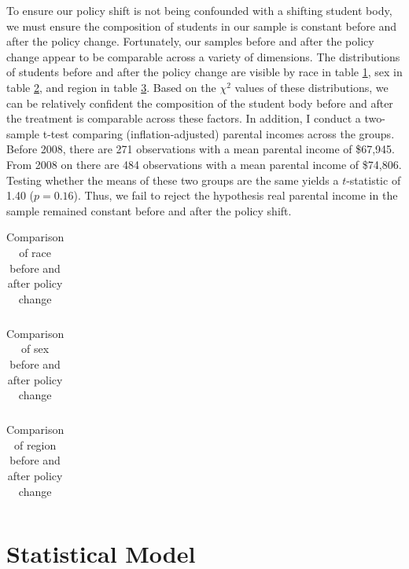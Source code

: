 \documentclass{article}
\begin{document}
	To ensure our policy shift is not being confounded with a shifting student body, we must ensure the composition of students in our sample is constant before and after the policy change. Fortunately, our samples before and after the policy change appear to be comparable across a variety of dimensions. The distributions of students before and after the policy change are visible by race in table \ref{racecomp}, sex in table \ref{sexcomp}, and region in table \ref{regioncomp}. Based on the $\chi^2$ values of these distributions, we can be relatively confident the composition of the student body before and after the treatment is comparable across these factors. In addition, I conduct a two-sample t-test comparing (inflation-adjusted) parental incomes across the groups. Before 2008, there are 271 observations with a mean parental income of \$67,945. From 2008 on there are 484 observations with a mean parental income of \$74,806. Testing whether the means of these two groups are the same yields a $t$-statistic of 1.40 ($p = 0.16$). Thus, we fail to reject the hypothesis real parental income in the sample remained constant before and after the policy shift. 
	
{
	\begin{table}
		\centering
		\caption{Comparison of race before and after policy change}
		\begin{tabular}{lrrrrrrrr}
						
		\end{tabular}
		\label{racecomp}
	\end{table}

	\begin{table}
		\centering
		\caption{Comparison of sex before and after policy change}
		\begin{tabular}{lrrrrrr}
			
		\end{tabular}
		\label{sexcomp}
	\end{table}

	\begin{table}
		\centering
		\caption{Comparison of region before and after policy change}
		\begin{tabular}{lrrrrrrrrrr}
			
		\end{tabular}
		\label{regioncomp}
	\end{table}
}
	
	\section{Statistical Model}
	
\end{document}
